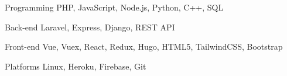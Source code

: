 
\begin{cvskills}

  \cvskill
    {Programming} %
    {PHP, JavaScript, Node.js, Python, C++, SQL} %

  \cvskill
    {Back-end} %
    {Laravel, Express, Django, REST API} %

  \cvskill
    {Front-end} %
    {Vue, Vuex, React, Redux, Hugo, HTML5, TailwindCSS, Bootstrap} %


  \cvskill
    {Platforms} %
    {Linux, Heroku, Firebase, Git} %

\end{cvskills}
